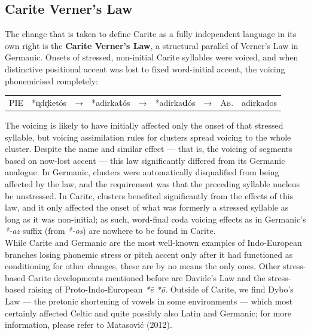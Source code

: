 \documentclass[svgnames,x11names,b5paper]{book}
\begin{document}
            \subsection{Carite Verner's Law}
        
        The change that is taken to define Carite as a fully independent language in its own right is the \textbf{Carite Verner's Law}, a structural parallel of Verner's Law in Germanic. Onsets of stressed, non-initial Carite syllables were voiced, and when distinctive positional accent was lost to fixed word-initial accent, the voicing phonemicised completely:

            \begin{table}[H]
                \begin{center}
                \begin{tabular}{llcllllll}
                \textsc{PIE} & *n̥dr̥ḱetós & → & *adirka\textbf{t}ós & → & *adirka\textbf{d}ós & → & \textsc{Ab.} & adirkados\\
                \end{tabular}
                \end{center}
                \end{table}
        
            The voicing is likely to have initially affected only the onset of that stressed syllable, but voicing assimilation rules for clusters spread voicing to the whole cluster. Despite the name and similar effect — that is, the voicing of segments based on now-lost accent — this law significantly differed from its Germanic analogue. In Germanic, clusters were automatically disqualified from being affected by the law, and the requirement was that the preceding syllable nucleus be unstressed. In Carite, clusters benefited significantly from the effects of this law, and it only affected the onset of what was formerly a stressed syllable as long as it was non-initial; as such, word-final coda voicing effects as in Germanic's \textit{*-az} suffix (from \textit{*-os}) are nowhere to be found in Carite.\\
While Carite and Germanic are the most well-known examples of Indo-European branches losing phonemic stress or pitch accent only after it had functioned as conditioning for other changes, these are by no means the only ones. Other stress-based Carite developments mentioned before are Davide's Law and the stress-based raising of Proto-Indo-European \textit{*ē *ō}. Outside of Carite, we find Dybo's Law — the pretonic shortening of vowels in some environments — which most certainly affected Celtic and quite possibly also Latin and Germanic; for more information, please refer to Matasović (2012).
\end{document}
